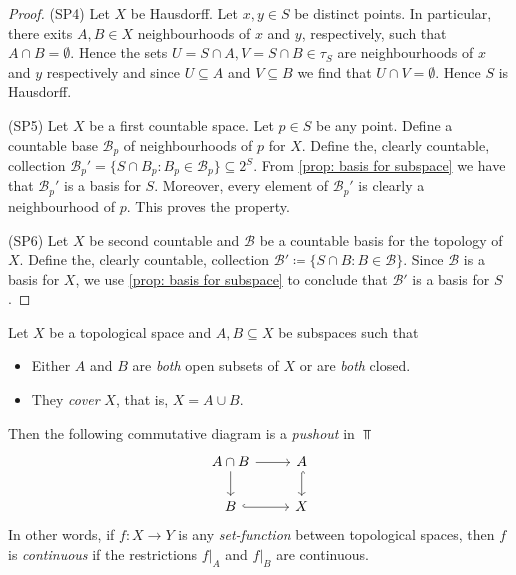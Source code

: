 \begin{proof}
    (SP4) Let \(X\) be Hausdorff. Let \(x, y \in S\) be distinct points. In
    particular, there exits \(A, B \in X\) neighbourhoods of \(x\) and \(y\),
    respectively, such that \(A \cap B = \emptyset\). Hence the sets \(U = S \cap
    A, V = S \cap B \in \tau_S\) are neighbourhoods of \(x\) and \(y\)
    respectively and since \(U \subseteq A\) and \(V \subseteq B\) we find that
    \(U \cap V = \emptyset\). Hence \(S\) is Hausdorff.

    (SP5) Let \(X\) be a first countable space. Let \(p \in S\) be any point.
    Define a countable base \(\mathcal B_p\) of neighbourhoods of \(p\) for \(X\).
    Define the, clearly countable, collection
    \(\mathcal B_p' = \{S \cap B_p \colon B_p \in \mathcal B_p\} \subseteq
    2^S\). From \cref{prop: basis for subspace} we have that \(\mathcal B_p'\) is a
    basis for \(S\). Moreover, every element of \(\mathcal B_p'\) is clearly a
    neighbourhood of \(p\). This proves the property.

    (SP6) Let \(X\) be second countable and \(\mathcal B\) be a countable basis for
    the topology of \(X\). Define the, clearly countable, collection
    \(\mathcal B' \coloneq \{S \cap B \colon B \in \mathcal B\}\). Since
    \(\mathcal B\) is a basis for \(X\), we use \cref{prop: basis for subspace} to
    conclude that \(\mathcal B'\) is a basis for \(S\).
\end{proof}

\begin{proposition}
    \label{prop:continuous-from-covering-subspaces}
    Let \(X\) be a topological space and \(A, B \subseteq X\) be subspaces such that
    \begin{itemize}\setlength\itemsep{0em}
        \item Either \(A\) and \(B\) are \emph{both} open subsets of \(X\) or are
              \emph{both} closed.

        \item They \emph{cover} \(X\), that is, \(X = A \cup B\).
    \end{itemize}
    Then the following commutative diagram is a \emph{pushout} in \(\Top\)
    \begin{equation}\label{eq:pushout-AcapB}
        \begin{tikzcd}
            A \cap B \ar[r] \ar[d] & A \ar[d, hook] \\
            B \ar[r, hook] & X
        \end{tikzcd}
    \end{equation}
    In other words, if \(f: X \to Y\) is any \emph{set-function} between topological
    spaces, then \(f\) is \emph{continuous} if the restrictions \(f|_A\) and
    \(f|_B\) are continuous.
\end{proposition}

